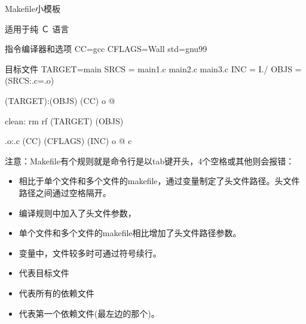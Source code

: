 \documentclass[letterpaper,12pt,english]{sphinxmanual}
\begin{document}
Makefile小模板

适用于纯 Ｃ 语言

\begin{sphinxVerbatim}[commandchars=\\\{\}]
\PYGZsh{} 指令编译器和选项
CC=gcc
CFLAGS=\PYGZhy{}Wall \PYGZhy{}std=gnu99

\PYGZsh{} 目标文件
TARGET=main
SRCS = main1.c \PYGZbs{}
            main2.c  \PYGZbs{}
            main3.c
INC = \PYGZhy{}I./
OBJS = \PYGZdl{}(SRCS:.c=.o)

\PYGZdl{}(TARGET):\PYGZdl{}(OBJS)
    \PYGZdl{}(CC) \PYGZhy{}o \PYGZdl{}@ \PYGZdl{}\PYGZca{}

clean:
    rm \PYGZhy{}rf \PYGZdl{}(TARGET) \PYGZdl{}(OBJS)

\PYGZpc{}.o:\PYGZpc{}.c
    \PYGZdl{}(CC) \PYGZdl{}(CFLAGS) \PYGZdl{}(INC) \PYGZhy{}o \PYGZdl{}@ \PYGZhy{}c \PYGZdl{}\PYGZlt{}
\end{sphinxVerbatim}

\begin{DUlineblock}{0em}
\item[] 注意：Makefile有个规则就是命令行是以tab键开头，4个空格或其他则会报错：
\item[] 
\end{DUlineblock}
\begin{itemize}
\item {} 
相比于单个文件和多个文件的makefile，通过变量制定了头文件路径。头文件路径之间通过空格隔开。

\item {} 
编译规则中加入了头文件参数，

\item {} 
单个文件和多个文件的makefile相比增加了头文件路径参数。

\item {} 
变量中，文件较多时可通过符号续行。

\item {} 
 \textendash{}代表目标文件

\item {} 
\sphinxcode{\sphinxupquote{\$\textasciicircum{}}} \textendash{}代表所有的依赖文件

\item {} 
\sphinxcode{\sphinxupquote{\$\textless{}}} \textendash{}代表第一个依赖文件(最左边的那个)。

\end{itemize}
\end{document}
